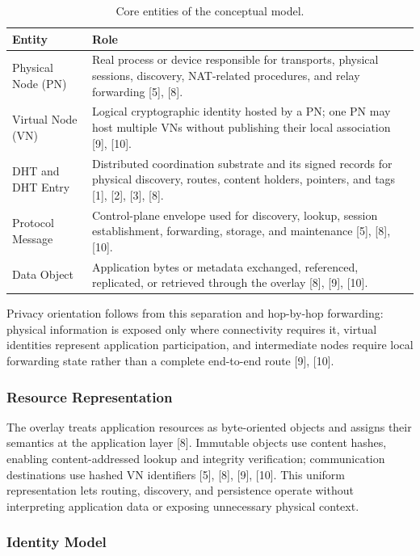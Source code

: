 \documentclass[12pt]{article}
\begin{document}
\begin{table}[H]
\centering
\caption{Core entities of the conceptual model.}
\label{tab:conceptual-entities}
\begin{tabularx}{\textwidth}{L{0.22\textwidth} Y}
\toprule
\textbf{Entity} & \textbf{Role} \\
\midrule
Physical Node (PN) & Real process or device responsible for transports, physical sessions, discovery, NAT-related procedures, and relay forwarding [5], [8]. \\
Virtual Node (VN) & Logical cryptographic identity hosted by a PN; one PN may host multiple VNs without publishing their local association [9], [10]. \\
DHT and DHT Entry & Distributed coordination substrate and its signed records for physical discovery, routes, content holders, pointers, and tags [1], [2], [3], [8]. \\
Protocol Message & Control-plane envelope used for discovery, lookup, session establishment, forwarding, storage, and maintenance [5], [8], [10]. \\
Data Object & Application bytes or metadata exchanged, referenced, replicated, or retrieved through the overlay [8], [9], [10]. \\
\bottomrule
\end{tabularx}
\end{table}

Privacy orientation follows from this separation and hop-by-hop forwarding: physical information is exposed only where connectivity requires it, virtual identities represent application participation, and intermediate nodes require local forwarding state rather than a complete end-to-end route [9], [10].


\subsubsection{Resource Representation}

The overlay treats application resources as byte-oriented objects and assigns their semantics at the application layer [8]. Immutable objects use content hashes, enabling content-addressed lookup and integrity verification; communication destinations use hashed VN identifiers [5], [8], [9], [10]. This uniform representation lets routing, discovery, and persistence operate without interpreting application data or exposing unnecessary physical context.

\subsubsection{Identity Model}
\end{document}
